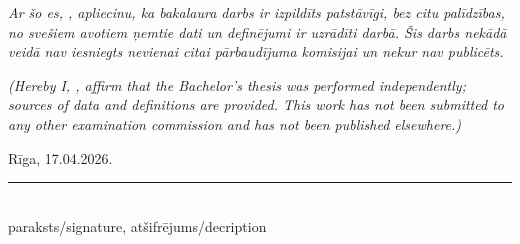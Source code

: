 \frontmatterpage
{}
\textit{Ar šo es, \studentnameLV, apliecinu, ka bakalaura darbs ir izpildīts patstāvīgi, bez citu palīdzības, no svešiem avotiem ņemtie dati un definējumi ir uzrādīti darbā. Šis darbs nekādā veidā nav iesniegts nevienai citai pārbaudījuma komisijai un nekur nav publicēts.}

\vspace{12mm}
\noindent \textit{(Hereby I, \studentnameEN, affirm that the Bachelor's thesis was performed independently; sources of data and definitions are provided. This work has not been submitted to any other examination commission and has not been published elsewhere.)}

\vspace{14mm}
\noindent Rīga, 17.04.2026.\hspace{1cm}\rule{5cm}{0.4pt}\\
\hspace*{7.1cm}\scriptsize paraksts/signature, atšifrējums/decription \hfill

